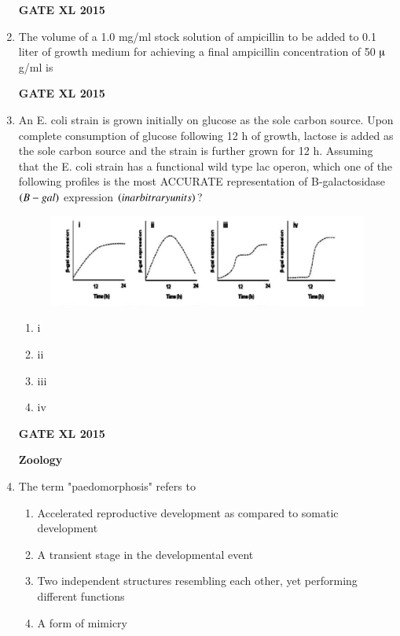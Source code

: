 \documentclass[journal,12pt,onecolumn]{IEEEtran}
\begin{document}
\begin{enumerate}
\begin{flushright}\textbf{GATE XL 2015}\end{flushright}
\item  The volume  of a 1.0 mg/ml stock solution of ampicillin to be added to 0.1 liter of growth medium for achieving a final ampicillin concentration of 50 $\micro$g/ml is
\begin{flushright}\textbf{GATE XL 2015}\end{flushright}
\item An E. coli strain is grown initially on glucose as the sole carbon source. Upon complete consumption of glucose following 12 h of growth, lactose is added as the sole carbon source and the strain is further grown for 12 h. Assuming that the E. coli strain has a functional wild type lac operon, which one of the following profiles is the most ACCURATE representation of B-galactosidase $\left(B-gal\right)$ expression $\left(in arbitrary units\right)$?
	\begin{figure}[h!]
	\includegraphics[width=15cm]{85}
		    \caption*{}
		\label{fig:Q85}
	\end{figure}
    \begin{enumerate}
            \item i
	    \item ii
	    \item iii
            \item iv
    \end{enumerate}
\begin{flushright}\textbf{GATE XL 2015}\end{flushright}
	\textbf{Zoology}
\item  The term "paedomorphosis" refers to
    \begin{enumerate}
            \item Accelerated reproductive development as compared to somatic development
	    \item A transient stage in the developmental event
	    \item  Two independent structures resembling each other, yet performing different functions
            \item A form of mimicry

\end{enumerate}
\end{enumerate}
\end{document}
